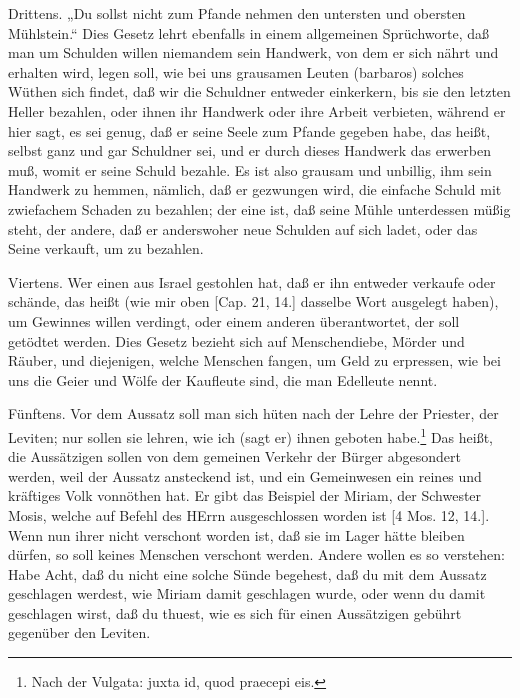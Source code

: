 Drittens. „Du sollst nicht zum Pfande nehmen den untersten und obersten Mühlstein.“ Dies Gesetz lehrt ebenfalls in einem allgemeinen Sprüchworte, daß man um Schulden willen niemandem sein Handwerk, von dem er sich nährt und erhalten wird, legen soll, wie bei uns grausamen Leuten (barbaros) solches Wüthen sich findet, daß wir die Schuldner entweder einkerkern, bis sie den letzten Heller bezahlen, oder ihnen ihr Handwerk oder ihre Arbeit verbieten, während er hier sagt, es sei genug, daß er seine Seele zum Pfande gegeben habe, das heißt, selbst ganz und gar Schuldner sei, und er durch dieses Handwerk das erwerben muß, womit er seine Schuld bezahle. Es ist also grausam und unbillig, ihm sein Handwerk zu hemmen, nämlich, daß er gezwungen wird, die einfache Schuld mit zwiefachem Schaden zu bezahlen; der eine ist, daß seine Mühle unterdessen müßig steht, der andere, daß er anderswoher neue Schulden auf sich ladet, oder das Seine verkauft, um zu bezahlen.

Viertens. Wer einen aus Israel gestohlen hat, daß er ihn entweder verkaufe oder schände, das heißt (wie mir oben [Cap. 21, 14.] dasselbe Wort ausgelegt haben), um Gewinnes willen verdingt, oder einem anderen überantwortet, der soll getödtet werden. Dies Gesetz bezieht sich auf Menschendiebe, Mörder und Räuber, und diejenigen, welche Menschen fangen, um Geld zu erpressen, wie bei uns die Geier und Wölfe der Kaufleute sind, die man Edelleute nennt.

Fünftens. Vor dem Aussatz soll man sich hüten nach der Lehre der Priester, der Leviten; nur sollen sie lehren, wie ich (sagt er) ihnen geboten habe.\footnote{Nach der Vulgata: juxta id, quod praecepi eis.} Das heißt, die Aussätzigen sollen von dem gemeinen Verkehr der Bürger abgesondert
werden, weil der Aussatz ansteckend ist, und ein Gemeinwesen ein reines und kräftiges Volk vonnöthen hat. Er gibt das Beispiel der Miriam, der Schwester Mosis, welche auf Befehl des HErrn ausgeschlossen worden ist [4 Mos. 12, 14.]. Wenn nun ihrer nicht verschont worden ist, daß sie im Lager hätte bleiben dürfen, so soll keines Menschen verschont werden. Andere wollen es so verstehen: Habe Acht, daß du nicht eine solche Sünde begehest, daß du mit dem Aussatz geschlagen werdest, wie Miriam damit geschlagen wurde, oder wenn du damit geschlagen wirst, daß du thuest, wie es sich für einen Aussätzigen gebührt gegenüber den Leviten.

